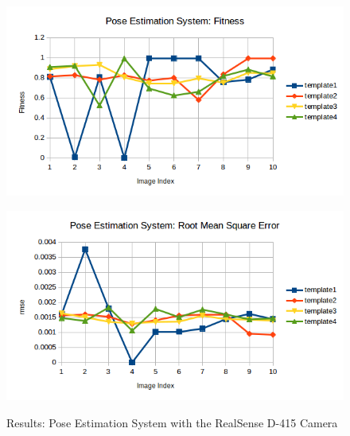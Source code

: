 \begin{figure}[htp]
\begin{center}
{
  \includegraphics[clip,width=0.8\columnwidth]{figures/newreal_fitness.png}
}
\end{center}
\begin{center}
{
  \includegraphics[clip,width=0.8\columnwidth]{figures/newreal_rmse.png}
}
\end{center}
\caption{Results: Pose Estimation System with the RealSense D-415 Camera}
\label{new1}
\end{figure}


